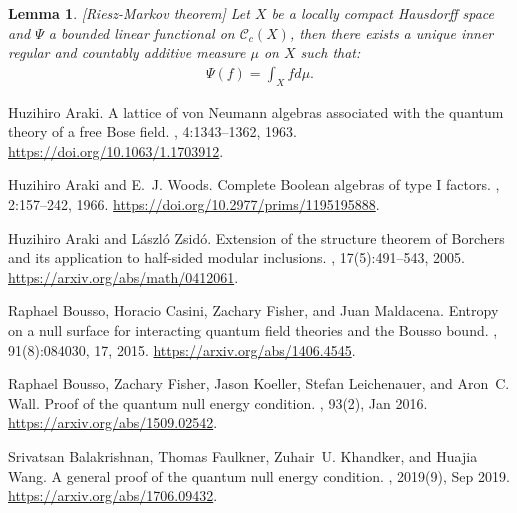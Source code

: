 \documentclass[12pt]{article}
\def\C{{\mathcal C}}
\newtheorem{lemma}[theorem]{Lemma}
\theoremstyle{remark}
\begin{document}
		\begin{lemma}\label{lem:Riesz-Markov}[Riesz-Markov theorem]
			Let $X$ be a locally compact Hausdorff space and $\Psi$ a bounded linear functional on $\C_c(X)$, then there exists a unique inner regular and countably additive measure $\mu$ on $X$ such that:	
				\begin{align*}
					\Psi(f)=\int_X f d\mu.
				\end{align*}
		\end{lemma}
	

{\small
\newcommand{\etalchar}[1]{$^{#1}$}
\def\cprime{$'$} \def\polhk#1{\setbox0=\hbox{#1}{\ooalign{\hidewidth
  \lower1.5ex\hbox{`}\hidewidth\crcr\unhbox0}}} \def\cprime{$'$}
\begin{thebibliography}{KLLSM18}

Huzihiro Araki.
\newblock A lattice of von {N}eumann algebras associated with the quantum
  theory of a free {B}ose field.
, 4:1343--1362, 1963.
\newblock \url{https://doi.org/10.1063/1.1703912}.

Huzihiro Araki and E.~J. Woods.
\newblock Complete {B}oolean algebras of type {I} factors.
, 2:157--242, 1966.
\newblock \url{https://doi.org/10.2977/prims/1195195888}.

Huzihiro Araki and L{\'a}szl{\'o} Zsid{\'o}.
\newblock Extension of the structure theorem of {B}orchers and its application
  to half-sided modular inclusions.
, 17(5):491--543, 2005.
\newblock \url{https://arxiv.org/abs/math/0412061}.

Raphael Bousso, Horacio Casini, Zachary Fisher, and Juan Maldacena.
\newblock Entropy on a null surface for interacting quantum field theories and
  the {B}ousso bound.
, 91(8):084030, 17, 2015.
\newblock \url{https://arxiv.org/abs/1406.4545}.

\bibitem[BFK{\etalchar{+}}16]{BFKLW16}
Raphael Bousso, Zachary Fisher, Jason Koeller, Stefan Leichenauer, and Aron~C.
  Wall.
\newblock Proof of the quantum null energy condition.
, 93(2), Jan 2016.
\newblock \url{https://arxiv.org/abs/1509.02542}.

Srivatsan Balakrishnan, Thomas Faulkner, Zuhair~U. Khandker, and Huajia Wang.
\newblock A general proof of the quantum null energy condition.
, 2019(9), Sep 2019.
\newblock \url{https://arxiv.org/abs/1706.09432}.


\end{thebibliography}}
\end{document}
